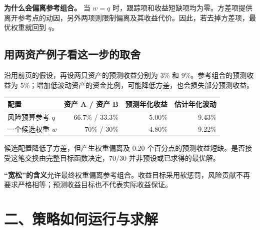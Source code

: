 \documentclass[UTF8,zihao=-4]{ctexart}
\newcommand{\note}[1]{{\small\color{softgray}#1\par}}
\newcommand{\askbox}[1]{\par\smallskip\colorbox{paleblue}{\parbox{\dimexpr\linewidth-2\fboxsep\relax}{\small #1}}\par}
\begin{document}
\textbf{为什么会偏离参考组合。} 当 $w=q$ 时，跟踪项和收益短缺项均为零。方差项提供离开参考点的动因，另外两项则限制偏离及其收益代价。因此，若去掉方差项，最优权重就回到 $q$。

\subsection*{用两资产例子看这一步的取舍}
沿用前页的假设，再设两只资产的预测收益分别为 3\% 和 9\%。参考组合的预测收益为 5\%；增加低波动资产的资金比例，可能降低方差，也会损失部分预测收益。
\begin{center}
{\small\renewcommand{\arraystretch}{1.15}
\begin{tabular}{@{}lrrr@{}}
\toprule
配置 & 资产 A / 资产 B & 预测年化收益 & 估计年化波动\\
\midrule
风险预算参考 $q$ & 66.7\% / 33.3\% & 5.00\% & 9.43\%\\
一个候选权重 $w$ & 70\% / 30\% & 4.80\% & 9.22\%\\
\bottomrule
\end{tabular}}
\end{center}
\note{候选配置降低了方差，但产生权重偏离及 0.20 个百分点的预测收益短缺。是否接受这笔交换由完整目标函数决定，70/30 并非预设或已求得的最优解。}
\askbox{\textbf{“宽松”的含义}\quad 允许最终权重偏离参考组合。收益目标采用软惩罚，风险贡献不再要求严格相等；预测收益目标也不代表实际收益保证。}

\clearpage
\section*{二、策略如何运行与求解}
\end{document}

